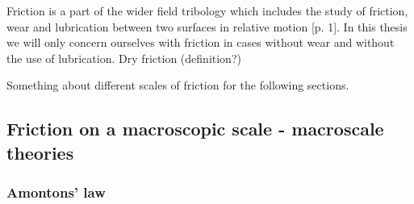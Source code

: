 


Friction is a part of the wider field tribology which includes the study of friction, wear and lubrication between two surfaces in relative motion 
\cite{gnecco_meyer_2015}[p. 1]. In this thesis we will only concern ourselves with friction in cases without wear and without the use of lubrication. Dry friction (definition?)


Something about different scales of friction for the following sections.



\subsection{Friction on a macroscopic scale - macroscale theories}
\subsubsection {Amontons’ law}

